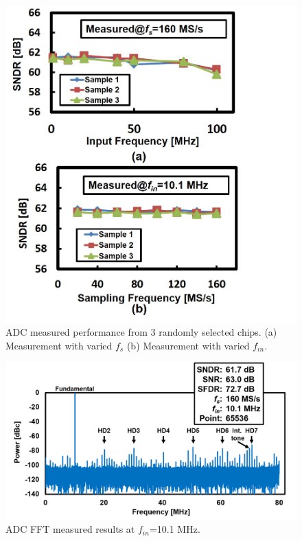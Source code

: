 \begin{figure}[!]
\centering
  \includegraphics[width=1\textwidth]{figure/chap2/meas-input-fs.jpg}
  \caption{ADC measured performance from 3 randomly selected chips. (a) Measurement with varied $f_s$ (b) Measurement with varied $f_{in}$.}
  \label{fig-meas-input-fs}
\end{figure}
\begin{figure}[!]
\centering
  \includegraphics[width=1\textwidth]{figure/chap2/FFT.png}
  \caption{ADC FFT measured results at $f_{in}$=10.1 MHz.}
  \label{fig-FFT}
\end{figure}
